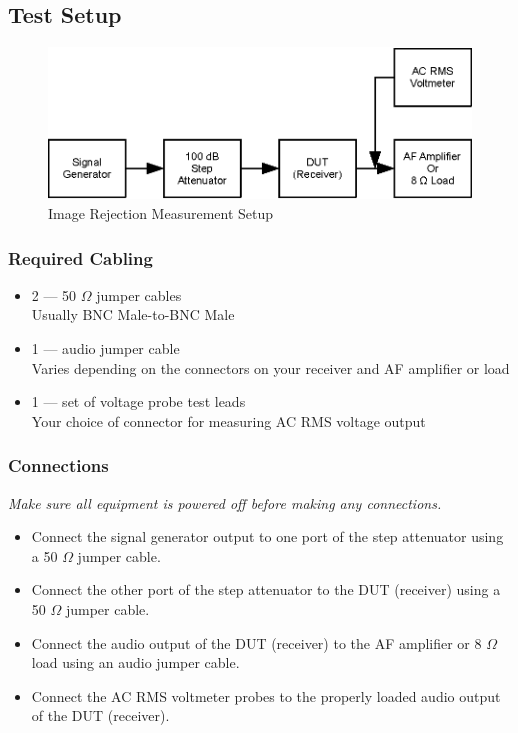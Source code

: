 \documentclass[10pt,letterpaper]{book}
\begin{document}
\subsection*{Test Setup}
\begin{figure}
\centering
\includegraphics[scale=1]{Illustrations/MDSSetup}
\caption{Image Rejection Measurement Setup}
\end{figure}
\subsubsection*{Required Cabling}
\begin{itemize}
	\item 2 --- 50 $\Omega$ jumper cables \\
		Usually BNC Male-to-BNC Male
	\item 1 --- audio jumper cable \\
		Varies depending on the connectors on your receiver and AF amplifier or load
	\item 1 --- set of voltage probe test leads \\
		Your choice of connector for measuring AC RMS voltage output
\end{itemize}
\subsubsection*{Connections}
\emph{Make sure all equipment is powered off before making any connections.}
\begin{itemize}
	\item Connect the signal generator output to one port of the step attenuator using a 50 $\Omega$ jumper cable.
	\item Connect the other port of the step attenuator to the DUT (receiver) using a 50 $\Omega$ jumper cable.
	\item Connect the audio output of the DUT (receiver) to the AF amplifier or 8 $\Omega$ load using an audio jumper cable.
	\item Connect the AC RMS voltmeter probes to the properly loaded audio output of the DUT (receiver).
\end{itemize}
\end{document}
